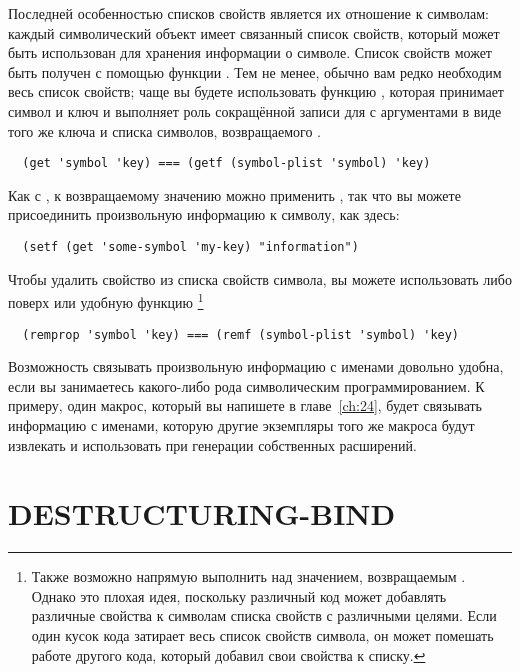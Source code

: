 Последней особенностью списков свойств является их отношение к символам: каждый
символический объект имеет связанный список свойств, который может быть использован для
хранения информации о символе. Список свойств может быть получен с помощью функции
. Тем не менее, обычно вам редко необходим весь список свойств; чаще вы
будете использовать функцию , которая принимает символ и ключ и выполняет роль
сокращённой записи для  с аргументами в виде того же ключа и списка символов,
возвращаемого .

\begin{verbatim}
  (get 'symbol 'key) === (getf (symbol-plist 'symbol) 'key)
\end{verbatim}

Как с , к возвращаемому значению  можно применить , так
что вы можете присоединить произвольную информацию к символу, как здесь:

\begin{verbatim}
  (setf (get 'some-symbol 'my-key) "information")
\end{verbatim}

Чтобы удалить свойство из списка свойств символа, вы можете использовать либо 
поверх  или удобную функцию  \footnote{Также возможно
  напрямую выполнить  над значением, возвращаемым . Однако
  это плохая идея, поскольку различный код может добавлять различные свойства к символам
  списка свойств с различными целями. Если один кусок кода затирает весь список свойств
  символа, он может помешать работе другого кода, который добавил свои свойства к списку.}

\begin{verbatim}
  (remprop 'symbol 'key) === (remf (symbol-plist 'symbol) 'key)
\end{verbatim}

Возможность связывать произвольную информацию с именами довольно удобна, если вы
занимаетесь какого-либо рода символическим программированием. К примеру, один макрос,
который вы напишете в главе~\ref{ch:24}, будет связывать информацию с именами, которую
другие экземпляры того же макроса будут извлекать и использовать при генерации собственных
расширений.

\section{DESTRUCTURING-BIND}

